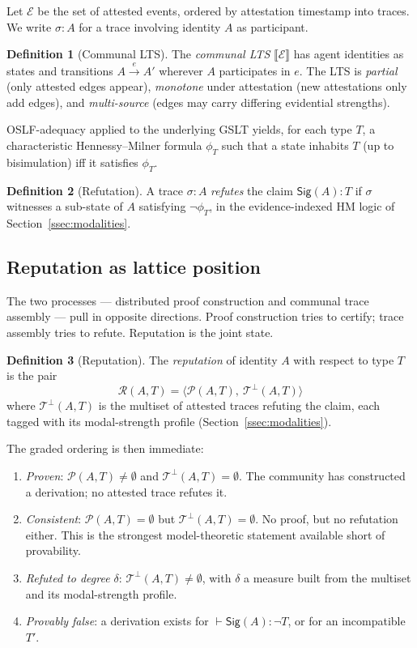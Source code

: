 \documentclass[11pt]{article}
\theoremstyle{definition}
\newtheorem{definition}{Definition}[section]
\theoremstyle{plain}
\theoremstyle{remark}
\newcommand{\Sig}{\mathsf{Sig}}
\newcommand{\sem}[1]{\llbracket #1 \rrbracket}
\newcommand{\Reps}{\mathcal{R}}
\newcommand{\Traces}{\mathcal{T}}
\newcommand{\Proofs}{\mathcal{P}}
\begin{document}
Let $\mathcal{E}$ be the set of attested events, ordered by attestation timestamp into traces. We write $\sigma : A$ for a trace involving identity $A$ as participant.

\begin{definition}[Communal LTS]
The \emph{communal LTS} $\sem{\mathcal{E}}$ has agent identities as states and transitions $A \xrightarrow{e} A'$ wherever $A$ participates in $e$. The LTS is \emph{partial} (only attested edges appear), \emph{monotone} under attestation (new attestations only add edges), and \emph{multi-source} (edges may carry differing evidential strengths).
\end{definition}

OSLF-adequacy applied to the underlying GSLT yields, for each type $T$, a characteristic Hennessy--Milner formula $\phi_T$ such that a state inhabits $T$ (up to bisimulation) iff it satisfies $\phi_T$.

\begin{definition}[Refutation]
A trace $\sigma : A$ \emph{refutes} the claim $\Sig(A) : T$ if $\sigma$ witnesses a sub-state of $A$ satisfying $\neg \phi_T$, in the evidence-indexed HM logic of Section~\ref{ssec:modalities}.
\end{definition}

\subsection{Reputation as lattice position}\label{ssec:lattice}

The two processes --- distributed proof construction and communal trace assembly --- pull in opposite directions. Proof construction tries to certify; trace assembly tries to refute. Reputation is the joint state.

\begin{definition}[Reputation]
The \emph{reputation} of identity $A$ with respect to type $T$ is the pair
\[
\Reps(A,T) = \langle \Proofs(A,T),\ \Traces^{\bot}(A,T) \rangle
\]
where $\Traces^{\bot}(A,T)$ is the multiset of attested traces refuting the claim, each tagged with its modal-strength profile (Section~\ref{ssec:modalities}).
\end{definition}

The graded ordering is then immediate:

\begin{enumerate}[label=(\roman*)]
\item \emph{Proven}: $\Proofs(A,T) \neq \emptyset$ and $\Traces^{\bot}(A,T) = \emptyset$. The community has constructed a derivation; no attested trace refutes it.
\item \emph{Consistent}: $\Proofs(A,T) = \emptyset$ but $\Traces^{\bot}(A,T) = \emptyset$. No proof, but no refutation either. This is the strongest model-theoretic statement available short of provability.
\item \emph{Refuted to degree $\delta$}: $\Traces^{\bot}(A,T) \neq \emptyset$, with $\delta$ a measure built from the multiset and its modal-strength profile.
\item \emph{Provably false}: a derivation exists for $\vdash \Sig(A) : \neg T$, or for an incompatible $T'$.
\end{enumerate}
\end{document}
